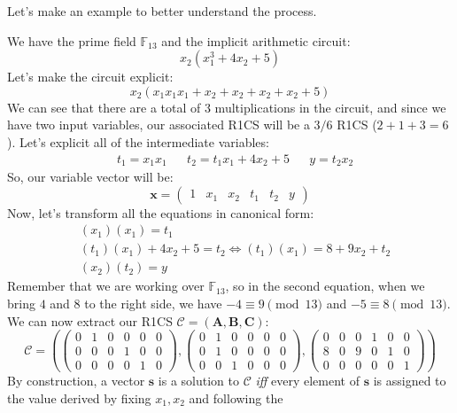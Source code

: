 \noindent Let's make an example to better understand the process.
\begin{example}\label{ex:r1cs}
	We have the prime field \(\mathbb{F}_{13}\) and the implicit arithmetic circuit:
	\[x_2(x_1^3 + 4x_2 + 5)\]
	Let's make the circuit explicit:
	\[x_2(x_1x_1x_1 + x_2 + x_2 + x_2 + x_2 + 5)\]
	We can see that there are a total of 3 multiplications in the circuit, and since we have two input
	variables, our associated R1CS will be a \(3/6\) R1CS (\(2+1+3 = 6\)).
	Let's explicit all of the intermediate variables:
	\begin{align*}
		 & t_1 = x_1x_1 &  & t_2 = t_1x_1 + 4x_2 + 5 &  & y = t_2x_2
	\end{align*}
	So, our variable vector will be:
	\[\bm{x} = \begin{pmatrix}1 & x_1 & x_2 & t_1 & t_2 & y\end{pmatrix}\]
	Now, let's transform all the equations in canonical form:
	\begin{align*}
		 & (x_1)(x_1) = t_1                                                 \\
		 & {(t_1)(x_1) + 4x_2 + 5 = t_2} \iff {(t_1)(x_1) = 8 + 9x_2 + t_2} \\
		 & (x_2)(t_2) = y
	\end{align*}
	Remember that we are working over \(\mathbb{F}_{13}\), so in the second equation, when we bring
	\(4\) and \(8\) to the right side, we have \(-4 \equiv 9 \pmod{13}\) and \(-5 \equiv 8 \pmod{13}\).
	We can now extract our R1CS \(\mathcal{C} = (\bm{A}, \bm{B}, \bm{C})\):
	\[
		\mathcal{C} =
		\left(
		\begin{pmatrix}
				0 & 1 & 0 & 0 & 0 & 0 \\
				0 & 0 & 0 & 1 & 0 & 0 \\
				0 & 0 & 0 & 0 & 1 & 0
			\end{pmatrix},
		\begin{pmatrix}
				0 & 1 & 0 & 0 & 0 & 0 \\
				0 & 1 & 0 & 0 & 0 & 0 \\
				0 & 0 & 1 & 0 & 0 & 0
			\end{pmatrix},
		\begin{pmatrix}
				0 & 0 & 0 & 1 & 0 & 0 \\
				8 & 0 & 9 & 0 & 1 & 0 \\
				0 & 0 & 0 & 0 & 0 & 1
			\end{pmatrix}
		\right)
	\]
	By construction, a vector \(\bm{s}\) is a solution to \(\mathcal{C}\) \emph{iff} every element
	of \(\bm{s}\) is assigned to the value derived by fixing \(x_1, x_2\) and following the

\end{example}

